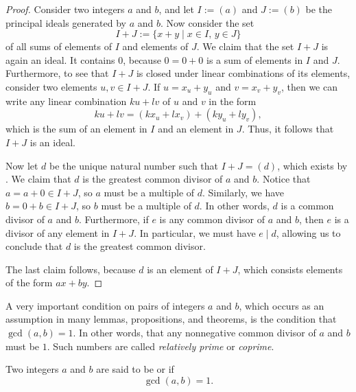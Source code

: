 \begin{proof}
  Consider two integers $a$ and $b$, and let $I:=(a)$ and $J:=(b)$ be the principal ideals generated by $a$ and $b$. Now consider the set
  \begin{equation*}
    I+J := \{x+y \mid x\in I,\,y\in J\}
  \end{equation*}
  of all sums of elements of $I$ and elements of $J$. We claim that the set $I+J$ is again an ideal. It contains $0$, because $0=0+0$ is a sum of elements in $I$ and $J$. Furthermore, to see that $I+J$ is closed under linear combinations of its elements, consider two elements $u,v\in I+J$. If $u=x_u+y_u$ and $v=x_v+y_v$, then we can write any linear combination $ku+lv$ of $u$ and $v$ in the form
  \begin{equation*}
    ku+lv = (kx_u + lx_v) + (ky_u + ly_v),
  \end{equation*}
  which is the sum of an element in $I$ and an element in $J$. Thus, it follows that $I+J$ is an ideal.

  Now let $d$ be the unique natural number such that $I+J=(d)$, which exists by . We claim that $d$ is the greatest common divisor of $a$ and $b$. Notice that $a=a+0\in I+J$, so $a$ must be a multiple of $d$. Similarly, we have $b=0+b\in I+J$, so $b$ must be a multiple of $d$. In other words, $d$ is a common divisor of $a$ and $b$. Furthermore, if $e$ is any common divisor of $a$ and $b$, then $e$ is a divisor of any element in $I+J$. In particular, we must have $e\mid d$, allowing us to conclude that $d$ is the greatest common divisor.

  The last claim follows, because $d$ is an element of $I+J$, which consists elements of the form $ax+by$.
\end{proof}

A very important condition on pairs of integers $a$ and $b$, which occurs as an assumption in many lemmas, propositions, and theorems, is the condition that $\gcd(a,b)=1$. In other words, that any nonnegative common divisor of $a$ and $b$ must be $1$. Such numbers are called \emph{relatively prime} or \emph{coprime}.

\begin{definition}
  Two integers $a$ and $b$ are said to be  or  if
  \begin{equation*}
    \gcd(a,b)=1.
  \end{equation*}
\end{definition}


